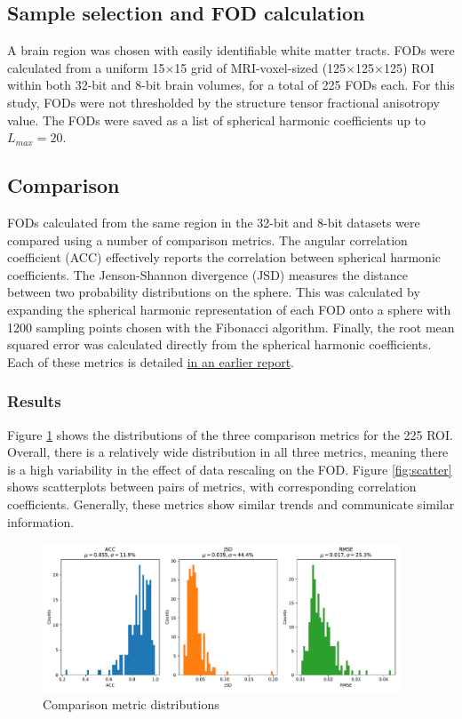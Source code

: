 \documentclass[11pt]{article}
\begin{document}
\subsection{Sample selection and FOD calculation}
A brain region was chosen with easily identifiable white matter tracts. FODs
were calculated from a uniform 15$\times$15 grid of MRI-voxel-sized
(125$\times$125$\times$125) ROI within both 32-bit and 8-bit brain volumes, for
a total of 225 FODs each. For this study, FODs were not thresholded by the
structure tensor fractional anisotropy value. The FODs were saved as a list of
spherical harmonic coefficients up to $L_{max}=20$.

\subsection{Comparison}
FODs calculated from the same region in the 32-bit and 8-bit datasets were
compared using a number of comparison metrics. The angular correlation
coefficient (ACC) effectively reports the correlation between spherical harmonic
coefficients. The Jenson-Shannon divergence (JSD) measures the distance between
two probability distributions on the sphere. This was calculated by expanding
the spherical harmonic representation of each FOD onto a sphere with 1200
sampling points chosen with the Fibonacci algorithm. Finally, the root mean
squared error was calculated directly from the spherical harmonic
coefficients. Each of these metrics is detailed
\href{https://github.com/scott-trinkle/uCTdMRI/blob/master/notes/2018-05-22-tuning-parameters/report/report.pdf}{in
  an earlier report}.\

\subsubsection{Results}

Figure \ref{fig:histograms} shows the distributions of the three comparison
metrics for the 225 ROI. Overall, there is a relatively wide distribution in all
three metrics, meaning there is a high variability in the effect of data rescaling
on the FOD. Figure \ref{fig:scatter} shows scatterplots between pairs of metrics,
with corresponding correlation coefficients. Generally, these metrics show similar
trends and communicate similar information. 

\begin{figure}[h]
  \centering
  \includegraphics[width=0.95\textwidth]{../plots/hists}
  \caption{Comparison metric distributions}
  \label{fig:histograms}
\end{figure}
\end{document}

